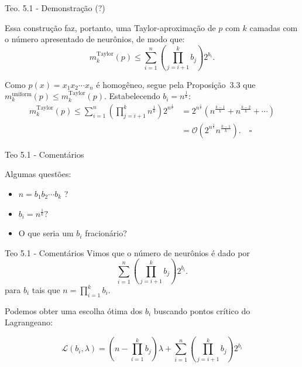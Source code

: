 \documentclass{beamer}
\theoremstyle{definition}
\begin{document}
\begin{frame}{Teo. 5.1 - Demonstração (?)}
    \small

    Essa construção faz, portanto, uma Taylor-aproximação de $p$ com $k$ camadas com o número apresentado de neurônios, de modo que:
    \begin{equation}
        m^\text{Taylor}_k(p) \leq \sum_{i=1}^n\left(\prod^k_{j=i+1} b_j \right) 2^{b_i}.
    \end{equation}
    
    \pause

    Como $p(x) = x_1 x_2 \cdots x_n$ é homogêneo, segue pela Proposição~3.3 que $m^\text{uniform}_k (p) \leq m^\text{Taylor}_k(p)$. \pause Estabelecendo $b_i = n^{\frac 1 k}$:
    \begin{align*}
        m^\text{Taylor}_k(p) \leq \sum_{i=1}^n\left(\prod^k_{j=i+1} n^{\frac 1 k} \right) 2^{n^{\frac 1 k}} 
        &= 2^{n^{\frac 1 k}} \left( n^{\frac{k-1}{k}} + n^{\frac{k-2}{k}} + \cdots  \right) \\
        &= \mathcal O (2^{n^{\frac 1 k}} n^{\frac{k-1}{k}}). \quad \square
    \end{align*}

\end{frame}

\begin{frame}{Teo 5.1 - Comentários}

    Algumas questões:
    \begin{itemize}
        \item $n= b_1b_2 \cdots b_k$ ? \pause
        \item $b_i = n^{\frac 1 k} ?$ \pause
        \item O que seria um $b_i$ fracionário?
    \end{itemize}
\end{frame}

\begin{frame}{Teo 5.1 - Comentários}
    Vimos que o número de neurônios é dado por
    \begin{equation*}
        \sum_{i=1}^n\left(\prod^k_{j=i+1} b_j \right) 2^{b_i}.
    \end{equation*}
    para $b_i$ tais que $n = \prod^k_{i=1} b_i$.
    
    \pause
    Podemos obter uma escolha ótima dos $b_i$ buscando pontos crítico do Lagrangeano:

    \begin{equation*}
        \mathcal L(b_i, \lambda) = \left(n - \prod_{i=1}^k b_j\right)\lambda +\sum_{i=1}^n\left(\prod^k_{j=i+1} b_j \right) 2^{b_i}
    \end{equation*}
    
\end{frame}
\end{document}
